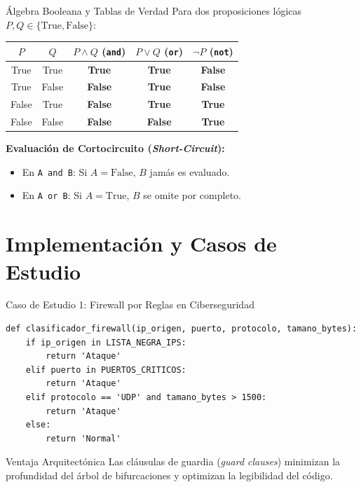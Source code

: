 \documentclass[aspectratio=169]{beamer}
\begin{document}
\begin{frame}{Álgebra Booleana y Tablas de Verdad}
    Para dos proposiciones lógicas $P, Q \in \{\text{True}, \text{False}\}$:
    \begin{center}
    \begin{tabular}{ccccc}
        \toprule
        $P$ & $Q$ & $P \land Q$ (\texttt{and}) & $P \lor Q$ (\texttt{or}) & $\neg P$ (\texttt{not}) \\
        \midrule
        True & True & \textbf{True} & \textbf{True} & \textbf{False} \\
        True & False & \textbf{False} & \textbf{True} & \textbf{False} \\
        False & True & \textbf{False} & \textbf{True} & \textbf{True} \\
        False & False & \textbf{False} & \textbf{False} & \textbf{True} \\
        \bottomrule
    \end{tabular}
    \end{center}
    \vspace{0.3cm}
    \textbf{Evaluación de Cortocircuito (\textit{Short-Circuit}):}
    \begin{itemize}
        \item En \texttt{A and B}: Si $A = \text{False}$, $B$ jamás es evaluado.
        \item En \texttt{A or B}: Si $A = \text{True}$, $B$ se omite por completo.
    \end{itemize}
\end{frame}

\section{Implementación y Casos de Estudio}

\begin{frame}[fragile]{Caso de Estudio 1: Firewall por Reglas en Ciberseguridad}
\begin{lstlisting}
def clasificador_firewall(ip_origen, puerto, protocolo, tamano_bytes):
    if ip_origen in LISTA_NEGRA_IPS:
        return 'Ataque'
    elif puerto in PUERTOS_CRITICOS:
        return 'Ataque'
    elif protocolo == 'UDP' and tamano_bytes > 1500:
        return 'Ataque'
    else:
        return 'Normal'
\end{lstlisting}
\begin{exampleblock}{Ventaja Arquitectónica}
    Las cláusulas de guardia (\textit{guard clauses}) minimizan la profundidad del árbol de bifurcaciones y optimizan la legibilidad del código.
\end{exampleblock}
\end{frame}
\end{document}
